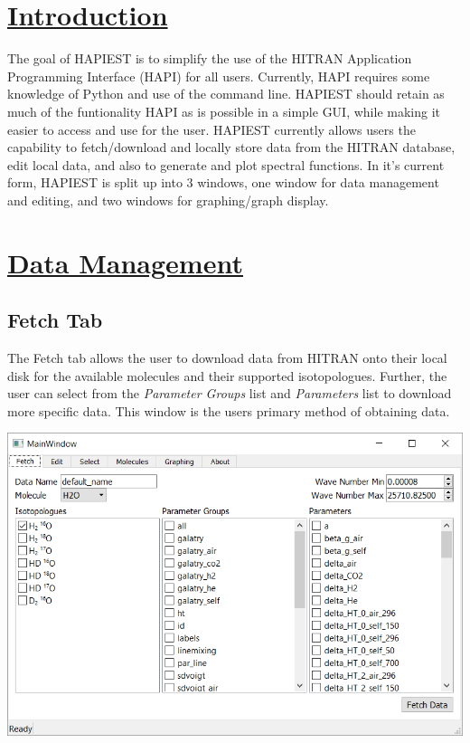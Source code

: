 \documentclass[a0,landscape]{a0poster}
\begin{document}
\begin{multicols}{3}


\color{Black}
\section*{\underline{Introduction}}
The goal of HAPIEST is to simplify the use of the HITRAN Application Programming Interface (HAPI) for all users. Currently, HAPI requires some knowledge of Python and use of the command line. HAPIEST should retain as much of the funtionality HAPI as is possible in a simple GUI, while making it easier to access and use for the user. HAPIEST currently allows users the capability to fetch/download and locally store data from the HITRAN database, edit local data, and also to generate and plot spectral functions. In it's current form, HAPIEST is split up into 3 windows, one window for data management and editing, and two windows for graphing/graph display.


\section*{\underline{Data Management}}

\subsection*{Fetch Tab}
The Fetch tab allows the user to download data from HITRAN onto their local disk for the available molecules and their supported isotopologues. Further, the user can select from the \textit{Parameter Groups} list and \textit{Parameters} list to download more specific data. This window is the users primary method of obtaining data.
\begin{center}
\includegraphics[scale = 1.5]{MainWindow_Fetch.png}
\end{center}


\end{multicols}
\end{document}
